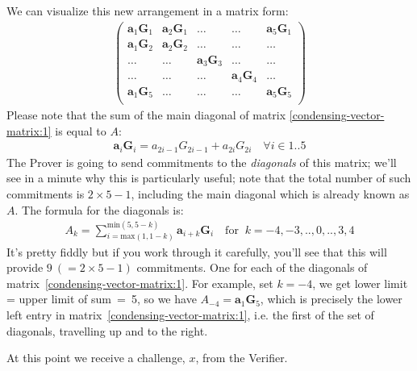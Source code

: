 \documentclass[10pt,a4paper]{article}
\begin{document}
We can visualize this new arrangement in a matrix form:
\begin{align}
\begin{pmatrix}
\textbf{a}_1\textbf{G}_1 & \textbf{a}_2\textbf{G}_1 & \dots & \dots & \textbf{a}_5\textbf{G}_1 \\
\textbf{a}_1\textbf{G}_2 &  \textbf{a}_2\textbf{G}_2& \dots & \dots & \dots \\
\dots & \dots & \textbf{a}_3\textbf{G}_3 & \dots & \dots \\
\dots & \dots & \dots & \textbf{a}_4\textbf{G}_4 & \dots  \\
\textbf{a}_1\textbf{G}_5 & \dots & \dots & \dots & \textbf{a}_5\textbf{G}_5 \\
\end{pmatrix}
\label{condensing-vector-matrix:1}
\end{align}
Please note that the sum of the main diagonal of matrix \eqref{condensing-vector-matrix:1} is equal to $A$:
\begin{align*}
\textbf{a}_i \textbf{G}_i = a_{2i-1} G_{2i-1} + a_{2i}G_{2i} \quad \forall i \in 1..5
\end{align*}
The Prover is going to send commitments to the \emph{diagonals} of this
matrix; we'll see in a minute why this is particularly useful; note that
the total number of such commitments is $2\times 5 -1$, including the main
diagonal which is already known as $A$. The formula for the diagonals is:
\begin{align}
A_k = \sum\limits_{i=\textrm{max}(1, 1-k)}^{\textrm{min}(5, 5-k)} \textbf{a}_{i+k}\textbf{G}_i \quad \textrm{for }\ k=-4,-3,..,0,..,3,4 \label{condensing-vector-diagonals-A_k:1}
\end{align}
It's pretty fiddly but if you work through it carefully, you'll see that
this will provide $9\ (= 2\times 5 -1)$ commitments. One for each of the
diagonals of matrix~\eqref{condensing-vector-matrix:1}. For example, set $k=-4$, we get
lower limit = upper limit of sum~=~5, so we have $A_{-4} = \mathbf{a}_1\mathbf{G}_5$, which is precisely
the lower left entry in matrix~\eqref{condensing-vector-matrix:1}, i.e. the first of the set of
diagonals, travelling up and to the right.

At this point we receive a challenge, $x$, from the Verifier.
\end{document}
